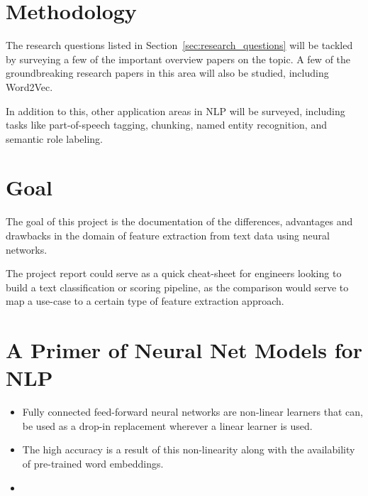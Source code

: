 \documentclass[parskip=half]{scrartcl}
\begin{document}

\section{Methodology} %
\label{sec:methodology}

    The research questions listed in Section~\ref{sec:research_questions} will be tackled by surveying a few of the important overview papers on the topic\cite{goldberg2016primer}\cite{bengio2003neural}\cite{morin2005hierarchical}. A few of the groundbreaking research papers in this area will also be studied, including Word2Vec\cite{mikolov2013efficient}\cite{mikolov2013distributed}\cite{mikolov2013linguistic}.

    In addition to this, other application areas in NLP will be surveyed, including tasks like part-of-speech tagging, chunking, named entity recognition, and semantic role labeling. \cite{socher2011parsing}\cite{luong2013better}\cite{maas2015lexicon}\cite{li2015hierarchical}\cite{collobert2011natural}\cite{pennington2014glove}



\section{Goal} %
\label{sec:goal}

    The goal of this project is the documentation of the differences, advantages and drawbacks in the domain of feature extraction from text data using neural networks. 

    The project report could serve as a quick cheat-sheet for engineers looking to build a text classification or scoring pipeline, as the comparison would serve to map a use-case to a certain type of feature extraction approach.



\newpage


\section{A Primer of Neural Net Models for NLP} %
\label{sec:a_primer_of_neural_net_models_for_nlp}

    \begin{itemize}
        \item 
        Fully connected feed-forward neural networks are non-linear learners that can, be used as a drop-in replacement wherever a linear learner is used.
        \item 
        The high accuracy is a result of this non-linearity along with the availability of pre-trained word embeddings.
        \item 
        
    \end{itemize}





\end{document}
